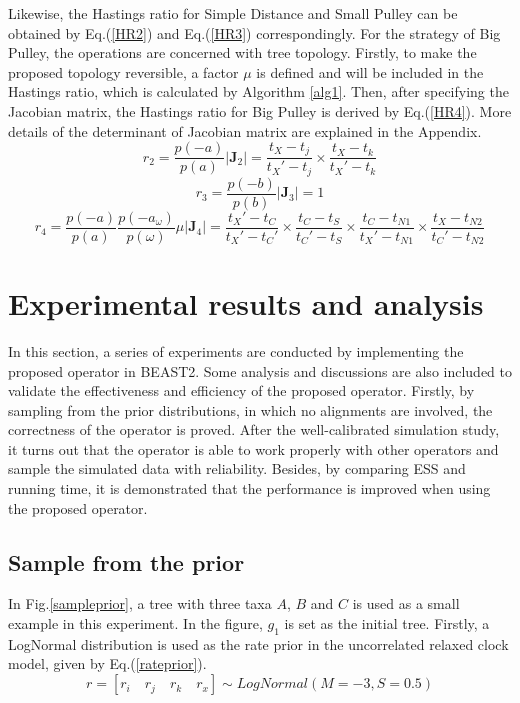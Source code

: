 \documentclass{bmcart}
\begin{document}
Likewise, the Hastings ratio for Simple Distance and Small Pulley can be obtained by Eq.(\ref{HR2}) and Eq.(\ref{HR3}) correspondingly. For the strategy of Big Pulley, the operations are concerned with tree topology. Firstly, to make the proposed topology reversible, a factor $\mu$ is defined and will be included in the Hastings ratio, which is calculated by Algorithm \ref{alg1}. Then, after specifying the Jacobian matrix, the Hastings ratio for Big Pulley is derived by Eq.(\ref{HR4}). More details of the determinant of Jacobian matrix are explained in the Appendix. 
\begin{equation}\label{HR2}
{r_2} = \frac{{p( - a)}}{{p(a)}}\left| {{{\mathbf{J}}_2}} \right| = \frac{{{t_X} - {t_j}}}{{{t_X}' - {t_j}}} \times \frac{{{t_X} - {t_k}}}{{{t_X}' - {t_k}}}
\end{equation}
\begin{equation}\label{HR3}
{r_3} = \frac{{p( - b)}}{{p(b)}}\left| {{{\mathbf{J}}_3}} \right| = 1
\end{equation}
\begin{equation}\label{HR4}
{r_4} = \frac{{p( - a)}}{{p(a)}}\frac{{p( - {a_\omega} )}}{{p(\omega )}}\mu \left| {{{\mathbf{J}}_4}} \right| = \frac{{{t_X}' - {t_C}}}{{{t_X}' - {t_C}'}} \times \frac{{{t_C} - {t_S}}}{{{t_C}' - {t_S}}} \times \frac{{{t_C} - {t_{N1}}}}{{{t_X}' - {t_{N1}}}} \times \frac{{{t_X} - {t_{N2}}}}{{{t_C}' - {t_{N2}}}}
\end{equation}
\section*{Experimental results and analysis}
In this section, a series of experiments are conducted by implementing the proposed operator in BEAST2. Some analysis and discussions are also included to validate the effectiveness and efficiency of the proposed operator. Firstly, by sampling from the prior distributions, in which no alignments are involved, the correctness of the operator is proved. After the well-calibrated simulation study, it turns out that the operator is able to work properly with other operators and sample the simulated data with reliability. Besides, by comparing ESS and running time, it is demonstrated that the performance is improved when using the proposed operator.
\subsection*{Sample from the prior}
In Fig.\ref{sampleprior}, a tree with three taxa $A$, $B$ and $C$ is used as a small example in this experiment. In the figure, $g_1$ is set as the initial tree. Firstly, a LogNormal distribution is used as the rate prior in the uncorrelated relaxed clock model, given by Eq.(\ref{rateprior}).
\begin{equation}\label{rateprior}
r = [{r_i}\quad{r_j}\quad{r_k}\quad{r_x}] \sim LogNormal(M = -3, S = 0.5)
\end{equation}
\end{document}
